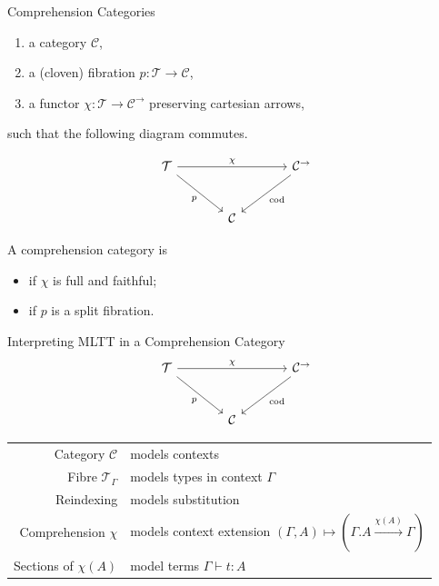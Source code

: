 \documentclass{beamer}
\begin{document}
\begin{frame}[fragile]{Comprehension Categories\cite{jacobs_comprehension}}
\begin{enumerate}
  \item a category $\mathcal{C}$,
  \item a (cloven) fibration $p \colon \mathcal{T} \to \mathcal{C}$,
  \item a functor $\chi \colon \mathcal{T} \to \mathcal{C}^\to$ preserving cartesian arrows,
\end{enumerate}
\noindent such that the following diagram commutes.

\[
\begin{tikzcd}[column sep=large, row sep=large]
\mathcal{T} \arrow[rr, "\chi"] \arrow[dr, "p"'] & & \mathcal{C}^\to \arrow[dl, "\text{cod}"] \\
& \mathcal{C} & 
\end{tikzcd}
\]

\noindent A comprehension category is
\begin{itemize}
  \item[\textbf{full}] if $\chi$ is full and faithful;
  \item[\textbf{split}] if $p$ is a split fibration.
\end{itemize}
\end{frame}

\begin{frame}[fragile]{Interpreting MLTT in a Comprehension Category}
\[
\begin{tikzcd}[column sep=large, row sep=large]
\mathcal{T} \arrow[rr, "\chi"] \arrow[dr, "p"'] & & \mathcal{C}^\to \arrow[dl, "\text{cod}"] \\
& \mathcal{C} & 
\end{tikzcd}
\]

\vspace{1em}

\begin{tabular}{rl}
\textcolor{myblue}{Category $\mathcal{C}$} & models contexts \\
\textcolor{myblue}{Fibre $\mathcal{T}_\Gamma$} & models types in context $\Gamma$ \\
\textcolor{myblue}{Reindexing} & models substitution \\
\textcolor{myblue}{Comprehension $\chi$} & models context extension $(\Gamma, A) \mapsto (\Gamma.A \xrightarrow{\chi(A)} \Gamma)$ \\
\textcolor{myblue}{Sections of $\chi(A)$} & model terms $\Gamma \vdash t : A$ \\
\end{tabular}
\end{frame}
\end{document}

